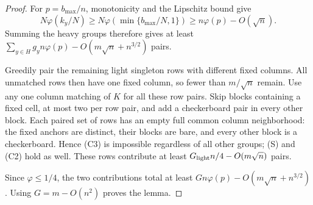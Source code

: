 \documentclass[11pt]{article}
\begin{document}
\begin{proof}
For $p=b_{\max}/n$, monotonicity and the Lipschitz bound give
\[
 N\varphi(k_y/N)
 \ge N\varphi(\min\{b_{\max}/N,1\})
 \ge n\varphi(p)-O(\sqrt n).
\]
Summing the heavy groups therefore gives at least
$\sum_{y\in H}g_y n\varphi(p)-O(m\sqrt n+n^{3/2})$ pairs.

Greedily pair the remaining light singleton rows with different fixed
columns. All unmatched rows then have one fixed column, so fewer than
$m/\sqrt n$ remain. Use any one column matching of $K$ for all these
row pairs. Skip blocks containing a fixed cell, at most two per row
pair, and add a checkerboard pair in every other block.
Each paired set of rows has an empty full common column neighborhood:
the fixed anchors are distinct, their blocks are bare, and every other
block is a checkerboard. Hence (C3) is impossible regardless of all
other groups; (S) and (C2) hold as well. These rows contribute at least
$G_{\rm light}n/4-O(m\sqrt n)$ pairs.

Since $\varphi\le1/4$, the two contributions total at least
$Gn\varphi(p)-O(m\sqrt n+n^{3/2})$.
Using $G=m-O(n^2)$ proves the lemma.
\end{proof}
\end{document}
